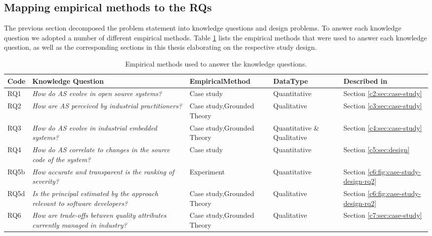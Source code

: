 \subsection{Mapping empirical methods to the RQs}
The previous section decomposed the problem statement into knowledge questions and design problems.
To answer each knowledge question we adopted a number of different empirical methods.
Table \ref{c1:tab:overview-methodology} lists the empirical methods that were used to answer each knowledge question, as well as the corresponding sections in this thesis elaborating on the respective study design.

\begin{table}[]
    \footnotesize
    \centering
    \caption{Empirical methods used to answer the knowledge questions.}
    \label{c1:tab:overview-methodology}
    \begin{tabular}{@{}lm{3.75cm}m{2.75cm}m{2cm}l@{}}
    \toprule
    \textbf{Code} & \textbf{Knowledge Question} & \textbf{Empirical}\newline \textbf{Method} & \textbf{Data}\newline \textbf{Type} & \textbf{Described in} \\ \midrule
    RQ1 & \textit{How do AS evolve in open source systems?} & Case study & Quantitative & Section \ref{c2:sec:case-study} \\
    RQ2 & \textit{How are AS perceived by industrial practitioners?} & Case study,\newline Grounded Theory & Qualitative & Section \ref{c3:sec:case-study}  \\
    RQ3 & \textit{How do AS evolve in industrial embedded systems?} & Case study,\newline Grounded Theory & Quantitative \& Qualitative & Section \ref{c4:sec:case-study} \\
    RQ4 & \textit{How do AS correlate to changes in the source code of the system?} & Case study & Quantitative  & Section \ref{c5:sec:design} \\
    RQ5b & \textit{How accurate and transparent is the ranking of severity?} & Experiment & Quantitative & Section \ref{c6:fig:case-study-design-rq2}  \\ 
    RQ5d & \textit{Is the principal estimated by the approach relevant to software developers?} & Case study,\newline Grounded Theory & Qualitative & Section \ref{c6:fig:case-study-design-rq2}  \\ 
    RQ6 & \textit{How are trade-offs between quality attributes currently managed in industry?} & Case study,\newline Grounded Theory & Qualitative & Section \ref{c7:sec:case-study} \\ \bottomrule
    \end{tabular}
\end{table}

